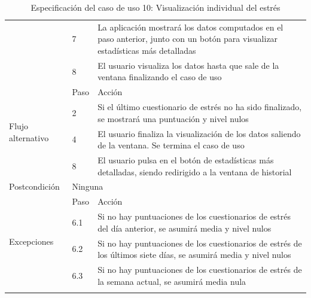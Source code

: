 \begin{table}[h]
\begin{tabularx}{\textwidth}{|l|l|X|}
            \cline{2-3} & 7 & La aplicación mostrará los datos computados en el paso anterior, junto con un botón para visualizar estadísticas más detalladas \\
            \cline{2-3} & 8 & El usuario visualiza los datos hasta que sale de la ventana finalizando el caso de uso \\
            \hline
            \multirow{4}{*}{Flujo alternativo} & Paso & Acción \\
            \cline{2-3} & 2 & Si el último cuestionario de estrés no ha sido finalizado, se mostrará una puntuación y nivel nulos \\
            \cline{2-3} & 4 & El usuario finaliza la visualización de los datos saliendo de la ventana. Se termina el caso de uso \\
            \cline{2-3} & 8 & El usuario pulsa en el botón de estadísticas más detalladas, siendo redirigido a la ventana de historial \\
            \hline
            Postcondición & \multicolumn{2}{|X|}{Ninguna} \\
            \hline
            \multirow{4}{*}{Excepciones}  & Paso & Acción \\
            \cline{2-3} & 6.1 & Si no hay puntuaciones de los cuestionarios de estrés del día anterior, se asumirá media y nivel nulos \\
            \cline{2-3} & 6.2 & Si no hay puntuaciones de los cuestionarios de estrés de los últimos siete días, se asumirá media y nivel nulos \\
            \cline{2-3} & 6.3 & Si no hay puntuaciones de los cuestionarios de estrés de la semana actual, se asumirá media nula \\
            \hline
            \caption{Especificación del caso de uso 10: Visualización individual del estrés}
            \label{tabla:casos_uso:visualizacion_individual_estres}
        \end{tabularx}
    \end{table}

